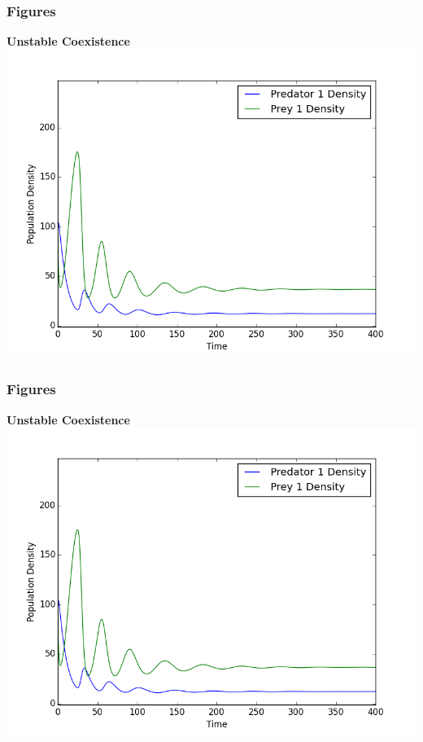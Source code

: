 \documentclass[10pt]{beamer}
\begin{document}
\begin{frame}
	\frametitle{Figures}
	{\bf Unstable Coexistence}
	\includegraphics[scale=0.5]{densities_2.png}
\end{frame}
\begin{frame}
	\frametitle{Figures}
	{\bf Unstable Coexistence}
	\includegraphics[scale=0.5]{densities_2.png}
\end{frame}
\end{document}

